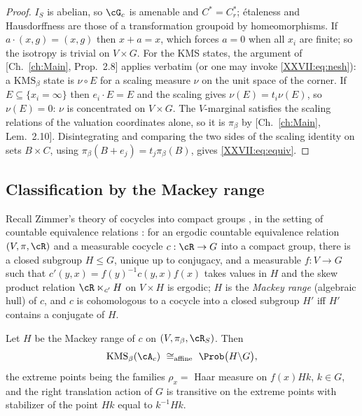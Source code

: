 \begin{proof}
$I_S$ is abelian, so $\cG_c$ is amenable and $C^*=C^*_r$; \'etaleness and Hausdorffness are
those of a transformation groupoid by homeomorphisms. If $a\cdot(x,g)=(x,g)$ then $x+a=x$,
which forces $a=0$ when all $x_i$ are finite; so the isotropy is trivial on $V\times G$. For
the KMS states, the argument of [Ch.~\ref{ch:Main}, Prop.~2.8] applies verbatim (or one may invoke
\eqref{XXVII:eq:nesh}): a $\mathrm{KMS}_\beta$ state is $\nu\circ E$ for a scaling measure $\nu$
on the unit space of the corner. If $E\subseteq\{x_i=\infty\}$ then $e_i\cdot E=E$ and the
scaling gives $\nu(E)=t_i\nu(E)$, so $\nu(E)=0$: $\nu$ is concentrated on $V\times G$. The
$V$-marginal satisfies the scaling relations of the valuation coordinates alone, so it is
$\pi_\beta$ by [Ch.~\ref{ch:Main}, Lem.~2.10]. Disintegrating and comparing the two sides of the
scaling identity on sets $B\times C$, using $\pi_\beta(B+e_j)=t_j\pi_\beta(B)$, gives
\eqref{XXVII:eq:equiv}.
\end{proof}

\subsection{Classification by the Mackey range}

Recall Zimmer's theory of cocycles into compact groups \cite[Ch.~4 and 9]{Zimmer}, in the
setting of countable equivalence relations \cite{FM}: for an ergodic countable equivalence
relation $(V,\pi,\cR)$ and a measurable cocycle
$c:\cR\to G$ into a compact group, there is a closed subgroup $H\le G$, unique up to
conjugacy, and a measurable $f:V\to G$ such that $c'(y,x)=f(y)^{-1}c(y,x)f(x)$ takes values in
$H$ and the skew product relation $\cR\ltimes_{c'}H$ on $V\times H$ is ergodic; $H$ is the
\emph{Mackey range} (algebraic hull) of $c$, and $c$ is cohomologous to a cocycle into a
closed subgroup $H'$ iff $H'$ contains a conjugate of $H$.

\begin{theorem}\label{XXVII:thm:simplex}
Let $H$ be the Mackey range of $c$ on $(V,\pi_\beta,\cR_S)$. Then
\[
\mathrm{KMS}_\beta(\cA_c)\ \cong_{\mathrm{affine}}\ \Prob\bigl(H\backslash G\bigr),
\]
the extreme points being the families $\rho_x=$ Haar measure on $f(x)Hk$, $k\in G$, and the
right translation action of $G$ is transitive on the extreme points with stabilizer of the
point $Hk$ equal to $k^{-1}Hk$.
\end{theorem}

